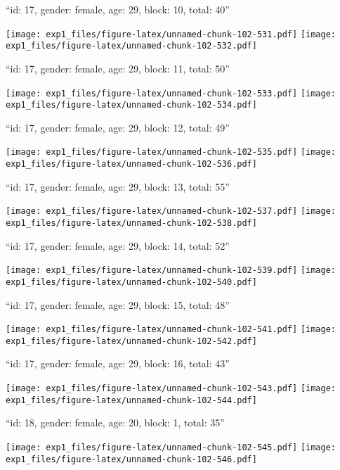 \documentclass[11pt,,]{article}
\begin{document}
\newpage
[1] 

``id: 17, gender: female, age: 29, block: 10, total: 40''

\texttt{[image: exp1\_files/figure-latex/unnamed-chunk-102-531.pdf]}
\texttt{[image: exp1\_files/figure-latex/unnamed-chunk-102-532.pdf]}

\newpage
[1] 

``id: 17, gender: female, age: 29, block: 11, total: 50''

\texttt{[image: exp1\_files/figure-latex/unnamed-chunk-102-533.pdf]}
\texttt{[image: exp1\_files/figure-latex/unnamed-chunk-102-534.pdf]}

\newpage
[1] 

``id: 17, gender: female, age: 29, block: 12, total: 49''

\texttt{[image: exp1\_files/figure-latex/unnamed-chunk-102-535.pdf]}
\texttt{[image: exp1\_files/figure-latex/unnamed-chunk-102-536.pdf]}

\newpage
[1] 

``id: 17, gender: female, age: 29, block: 13, total: 55''

\texttt{[image: exp1\_files/figure-latex/unnamed-chunk-102-537.pdf]}
\texttt{[image: exp1\_files/figure-latex/unnamed-chunk-102-538.pdf]}

\newpage
[1] 

``id: 17, gender: female, age: 29, block: 14, total: 52''

\texttt{[image: exp1\_files/figure-latex/unnamed-chunk-102-539.pdf]}
\texttt{[image: exp1\_files/figure-latex/unnamed-chunk-102-540.pdf]}

\newpage
[1] 

``id: 17, gender: female, age: 29, block: 15, total: 48''

\texttt{[image: exp1\_files/figure-latex/unnamed-chunk-102-541.pdf]}
\texttt{[image: exp1\_files/figure-latex/unnamed-chunk-102-542.pdf]}

\newpage
[1] 

``id: 17, gender: female, age: 29, block: 16, total: 43''

\texttt{[image: exp1\_files/figure-latex/unnamed-chunk-102-543.pdf]}
\texttt{[image: exp1\_files/figure-latex/unnamed-chunk-102-544.pdf]}

\newpage
[1] 

``id: 18, gender: female, age: 20, block: 1, total: 35''

\texttt{[image: exp1\_files/figure-latex/unnamed-chunk-102-545.pdf]}
\texttt{[image: exp1\_files/figure-latex/unnamed-chunk-102-546.pdf]}
\end{document}

